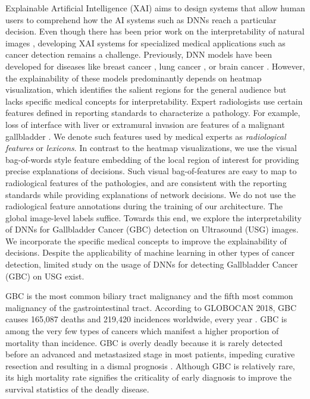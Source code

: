 \documentclass[twocolumn,final]{elsarticle}
\begin{document}
\par Explainable Artificial Intelligence (XAI) aims to design systems that allow human users to comprehend how the AI systems such as DNNs reach a particular decision. Even though there has been prior work on the interpretability of natural images \citep{bau2017network, monga2021algorithm}, developing XAI systems for specialized medical applications such as cancer detection remains a challenge. Previously, DNN models have been developed for diseases like breast cancer \citep{bejnordi2017diagnostic, lamy2019explainable}, lung cancer \citep{coudray2018classification}, or brain cancer \citep{pg-cam, ismael2020enhanced}. However, the explainability of these models predominantly depends on heatmap visualization, which identifies the salient regions for the general audience but lacks specific medical concepts for interpretability. Expert radiologists use certain features defined in reporting standards to characterize a pathology. For example, loss of interface with liver or extramural invasion are features of a malignant gallbladder \citep{gb-rads-paper}. We denote such features used by medical experts as \emph{radiological features} or \emph{lexicons}. In contrast to the heatmap visualizations, we use the visual bag-of-words style feature embedding of the local region of interest for providing precise explanations of decisions. Such visual bag-of-features are easy to map to radiological features of the pathologies, and are consistent with the reporting standards while providing explanations of network decisions. We do not use the radiological feature annotations during the training of our architecture. The global image-level labels suffice. Towards this end, we explore the interpretability of DNNs for Gallbladder Cancer (GBC) detection on Ultrasound (USG) images. We incorporate the specific medical concepts to improve the explainability of decisions. Despite the applicability of machine learning in other types of cancer detection, limited study on the usage of DNNs for detecting Gallbladder Cancer (GBC) on USG exist.

\par GBC is the most common biliary tract malignancy and the fifth most common malignancy of the gastrointestinal tract. According to GLOBOCAN 2018, GBC causes 165,087 deaths and 219,420 incidences worldwide, every year \citep{bray2018global}. GBC is among the very few types of cancers which manifest a higher proportion of mortality than incidence. GBC is overly deadly because it is rarely detected before an advanced and metastasized stage in most patients, impeding curative resection and resulting in a dismal prognosis \citep{batra2005gallbladder, randi2006gallbladder}. Although GBC is relatively rare, its high mortality rate signifies the criticality of early diagnosis to improve the survival statistics of the deadly disease. 
\end{document}
